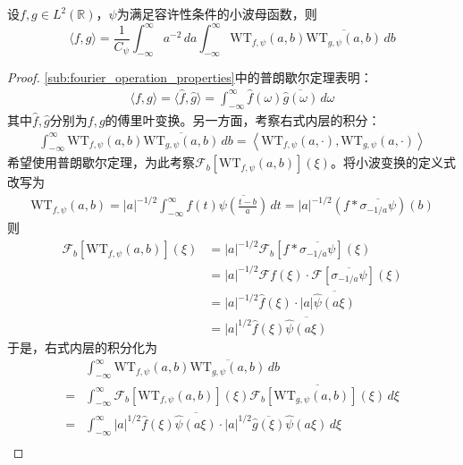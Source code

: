 \begin{theorem}[小波变换普朗歇尔公式]
    设$f,g\in L^2(\mathbb{R})$，$\psi$为满足容许性条件的小波母函数，则
    \[\langle f,g\rangle=\frac{1}{C_{\psi}}\int_{-\infty}^{\infty}a^{-2}\,da\int_{-\infty}^{\infty}\mathrm{WT} _{f,\psi}(a,b)\overline{\mathrm{WT} _{g,\psi}(a,b)}\,db\]
\end{theorem}
\begin{proof}
    \ref{sub:fourier_operation_properties}中的普朗歇尔定理表明：
    \begin{align*}
        \langle f,g\rangle=\langle \hat{f},\hat{g}\rangle=\int_{-\infty}^{\infty}\hat{f}(\omega)\overline{\hat{g}(\omega)}\,d\omega
    \end{align*}
    其中$\hat{f},\hat{g}$分别为$f,g$的傅里叶变换。另一方面，考察右式内层的积分：
    \begin{align*}
        \int_{-\infty}^{\infty}\mathrm{WT} _{f,\psi}(a,b)\overline{\mathrm{WT} _{g,\psi}(a,b)}\,db=\left\langle \mathrm{WT} _{f,\psi}(a,\cdot),\mathrm{WT} _{g,\psi}(a,\cdot)\right\rangle
    \end{align*}
    希望使用普朗歇尔定理，为此考察$\mathcal{F} _b[\mathrm{WT} _{f,\psi}(a,b)](\xi)$。将小波变换的定义式改写为
    \begin{align*}
        \mathrm{WT} _{f,\psi}(a,b)=|a|^{-1/2}\int_{-\infty}^{\infty}f(t)\overline{\psi\left(\frac{t-b}{a}\right)}\,dt=|a|^{-1/2}(f*\overline{\sigma_{-1/a}\psi})(b)
    \end{align*}
    则
    \begin{align*}
        \mathcal{F} _b[\mathrm{WT} _{f,\psi}(a,b)](\xi)&=|a|^{-1/2}\mathcal{F} _b[f*\overline{\sigma_{-1/a}\psi}](\xi)\\
        &=|a|^{-1/2}\mathcal{F} f(\xi)\cdot \mathcal{F} [\overline{\sigma_{-1/a}\psi}](\xi)\\
        &=|a|^{-1/2}\hat{f}(\xi)\cdot |a|\overline{\hat{\psi}(a\xi)}\\
        &=|a|^{1/2}\hat{f}(\xi)\overline{\hat{\psi}(a\xi)}
    \end{align*}
    于是，右式内层的积分化为
    \begin{align*}
        &\int_{-\infty}^{\infty}\mathrm{WT} _{f,\psi}(a,b)\overline{\mathrm{WT} _{g,\psi}(a,b)}\,db\\
        =&\int_{-\infty}^{\infty}\mathcal{F} _b[\mathrm{WT} _{f,\psi}(a,b)](\xi)\overline{\mathcal{F} _b[\mathrm{WT} _{g,\psi}(a,b)](\xi)}\,d\xi\\
        =&\int_{-\infty}^{\infty}|a|^{1/2}\hat{f}(\xi)\overline{\hat{\psi}(a\xi)}\cdot |a|^{1/2}\overline{\hat{g}(\xi)}\hat{\psi}(a\xi)\,d\xi\\

\end{align*}
\end{proof}
